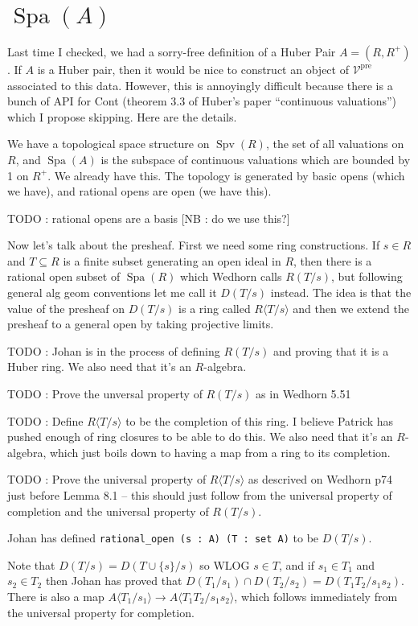 \documentclass{amsart}
\DeclareMathOperator{\Spa}{Spa}
\DeclareMathOperator{\Spv}{Spv}
\DeclareMathOperator{\pre}{pre}
\theoremstyle{plain}
\theoremstyle{remark}
\begin{document}
\section{$\Spa(A)$}

Last time I checked, we had a sorry-free definition of a Huber Pair $A=(R,R^+)$. If $A$ is a Huber pair, then it would be nice to construct an object of $\mathcal{V}^{\pre}$ associated to this data. However, this is annoyingly difficult because there is a bunch of API for Cont (theorem 3.3 of Huber's paper ``continuous valuations'') which I propose skipping. Here are the details.

We have a topological space structure on $\Spv(R)$, the set of all valuations on $R$, and $\Spa(A)$ is the subspace of continuous valuations which are bounded by 1 on $R^+$. We already have this. The topology is generated by basic opens (which we have), and rational opens are open (we have this).

TODO : rational opens are a basis [NB : do we use this?]

Now let's talk about the presheaf. First we need some ring constructions. If $s\in R$ and $T\subseteq R$ is a finite subset generating an open ideal in $R$, then there is a rational open subset of $\Spa(R)$ which Wedhorn calls $R(T/s)$, but following general alg geom conventions let me call it $D(T/s)$ instead. The idea is that the value of the presheaf on $D(T/s)$ is a ring called $R\langle T/s\rangle$ and then we extend the presheaf to a general open by taking projective limits.

TODO : Johan is in the process of defining $R(T/s)$ and proving that it is a Huber ring. We also need that it's an $R$-algebra.

TODO : Prove the unversal property of $R(T/s)$ as in Wedhorn 5.51

TODO : Define $R\langle T/s\rangle$ to be the completion of this ring. I believe Patrick has pushed enough of ring closures to be able to do this. We also need that it's an $R$-algebra, which just boils down to having a map from a ring to its completion.

TODO : Prove the universal property of $R\langle T/s\rangle$ as descrived on Wedhorn p74 just before Lemma 8.1 -- this should just follow from the universal property of completion and the universal property of $R(T/s)$.

Johan has defined {\tt rational\_open (s : A) (T : set A)} to be $D(T/s)$.

Note that $D(T/s)=D(T\cup\{s\}/s)$ so WLOG $s\in T$, and if $s_1\in T_1$ and $s_2\in T_2$ then Johan has proved that $D(T_1/s_1)\cap D(T_2/s_2)=D(T_1T_2/s_1s_2)$. There is also a map $A\langle T_1/s_1\rangle \to A\langle T_1T_2/s_1s_2\rangle$, which follows immediately from the universal property for completion.
\end{document}
